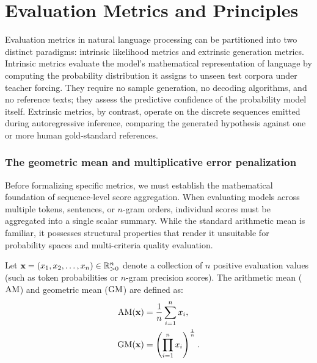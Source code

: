\documentclass[../../../main.tex]{subfiles}
\begin{document}
\section{Evaluation Metrics and Principles}
\label{sec:evaluation_metrics}

Evaluation metrics in natural language processing can be partitioned into two distinct paradigms: intrinsic likelihood metrics and extrinsic generation metrics. Intrinsic metrics evaluate the model's mathematical representation of language by computing the probability distribution it assigns to unseen test corpora under teacher forcing. They require no sample generation, no decoding algorithms, and no reference texts; they assess the predictive confidence of the probability model itself. Extrinsic metrics, by contrast, operate on the discrete sequences emitted during autoregressive inference, comparing the generated hypothesis against one or more human gold-standard references.

\subsubsection{The geometric mean and multiplicative error penalization}
Before formalizing specific metrics, we must establish the mathematical foundation of sequence-level score aggregation. When evaluating models across multiple tokens, sentences, or $n$-gram orders, individual scores must be aggregated into a single scalar summary. While the standard arithmetic mean is familiar, it possesses structural properties that render it unsuitable for probability spaces and multi-criteria quality evaluation.

Let $\mathbf{x} = (x_1, x_2, \dots, x_n) \in \mathbb{R}_{>0}^n$ denote a collection of $n$ positive evaluation values (such as token probabilities or $n$-gram precision scores). The arithmetic mean ($\mathrm{AM}$) and geometric mean ($\mathrm{GM}$) are defined as:
\begin{align}
\label{eq:arithmetic_mean_def}
\mathrm{AM}(\mathbf{x}) &= \frac{1}{n} \sum_{i=1}^n x_i, \\
\label{eq:geometric_mean_def}
\mathrm{GM}(\mathbf{x}) &= \left( \prod_{i=1}^n x_i \right)^{\frac{1}{n}}.
\end{align}
\end{document}
